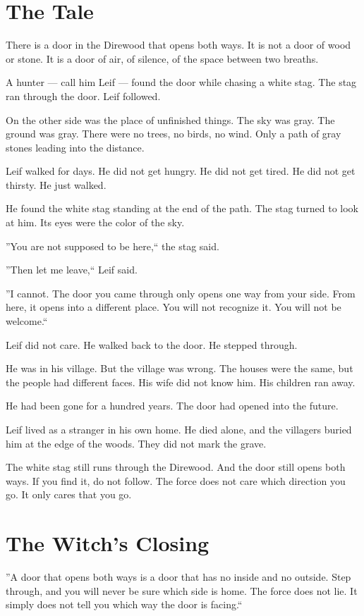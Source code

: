 \documentclass[10pt,twoside]{book}
\begin{document}
\section*{The Tale}
There is a door in the Direwood that opens both ways. It is not a door of wood or stone. It is a door of air, of silence, of the space between two breaths.

A hunter --- call him Leif --- found the door while chasing a white stag. The stag ran through the door. Leif followed.

On the other side was the place of unfinished things. The sky was gray. The ground was gray. There were no trees, no birds, no wind. Only a path of gray stones leading into the distance.

Leif walked for days. He did not get hungry. He did not get tired. He did not get thirsty. He just walked.

He found the white stag standing at the end of the path. The stag turned to look at him. Its eyes were the color of the sky.

''You are not supposed to be here,`` the stag said.

''Then let me leave,`` Leif said.

''I cannot. The door you came through only opens one way from your side. From here, it opens into a different place. You will not recognize it. You will not be welcome.``

Leif did not care. He walked back to the door. He stepped through.

He was in his village. But the village was wrong. The houses were the same, but the people had different faces. His wife did not know him. His children ran away.

He had been gone for a hundred years. The door had opened into the future.

Leif lived as a stranger in his own home. He died alone, and the villagers buried him at the edge of the woods. They did not mark the grave.

The white stag still runs through the Direwood. And the door still opens both ways. If you find it, do not follow. The force does not care which direction you go. It only cares that you go.

\section*{The Witch's Closing}
''A door that opens both ways is a door that has no inside and no outside. Step through, and you will never be sure which side is home. The force does not lie. It simply does not tell you which way the door is facing.``
\end{document}
